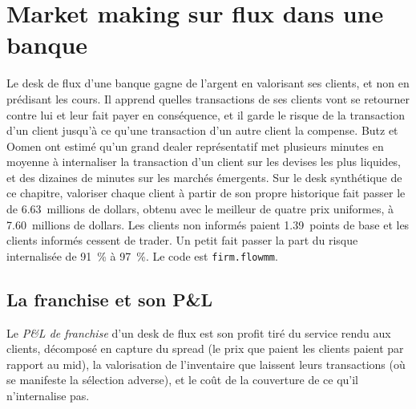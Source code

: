 \chapter{Market making sur flux dans une banque}\label{ch:s2:flow-market-making-at-a-bank}

Le desk de flux d'une banque gagne de l'argent en valorisant ses clients, et non en prédisant les cours. Il apprend quelles transactions de ses clients vont se retourner contre lui et leur fait payer
en conséquence, et il garde le risque de la transaction d'un client jusqu'à ce qu'une transaction d'un autre client la compense. Butz et Oomen ont estimé qu'un grand dealer représentatif
met plusieurs minutes en moyenne à internaliser la transaction d'un client sur les devises les plus liquides, et des dizaines de minutes sur les marchés émergents.
Sur le desk synthétique de ce chapitre, valoriser chaque client à partir de son propre historique fait passer le  de 6.63~millions de dollars, obtenu avec le meilleur
de quatre prix uniformes, à 7.60~millions de dollars. Les clients non informés paient 1.39~points de base et les clients informés cessent de trader. Un petit  fait passer la part du risque
internalisée de 91~\% à 97~\%. Le code est \texttt{firm.flowmm}.

\section{La franchise et son P\&L}

\begin{definition}[P\&L de franchise]\label{def:s2:flow-market-making-at-a-bank:franchise}
Le \emph{P\&L de franchise} d'un desk de flux est son profit tiré du service rendu aux clients, décomposé en capture du spread (le prix que paient les clients
paient par rapport au mid), la valorisation de l'inventaire que laissent leurs transactions (où se manifeste la sélection adverse), et le coût de la couverture de ce
qu'il n'internalise pas.
\end{definition}

